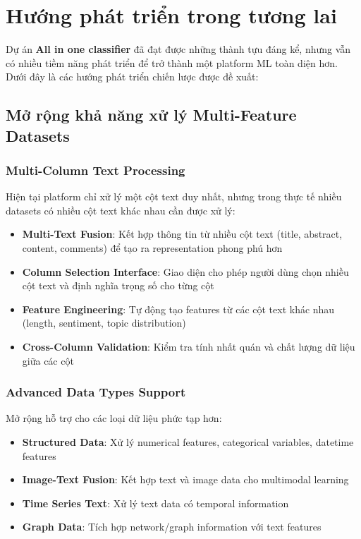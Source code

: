 \section{Hướng phát triển trong tương lai}

\noindent
Dự án \textbf{All in one classifier} đã đạt được những thành tựu đáng kể, nhưng vẫn có nhiều tiềm năng phát triển để trở thành một platform ML toàn diện hơn. Dưới đây là các hướng phát triển chiến lược được đề xuất:

\subsection{Mở rộng khả năng xử lý Multi-Feature Datasets}

\subsubsection{Multi-Column Text Processing}

Hiện tại platform chỉ xử lý một cột text duy nhất, nhưng trong thực tế nhiều datasets có nhiều cột text khác nhau cần được xử lý:

\begin{itemize}
    \item \textbf{Multi-Text Fusion}: Kết hợp thông tin từ nhiều cột text (title, abstract, content, comments) để tạo ra representation phong phú hơn
    \item \textbf{Column Selection Interface}: Giao diện cho phép người dùng chọn nhiều cột text và định nghĩa trọng số cho từng cột
    \item \textbf{Feature Engineering}: Tự động tạo features từ các cột text khác nhau (length, sentiment, topic distribution)
    \item \textbf{Cross-Column Validation}: Kiểm tra tính nhất quán và chất lượng dữ liệu giữa các cột
\end{itemize}

\subsubsection{Advanced Data Types Support}

Mở rộng hỗ trợ cho các loại dữ liệu phức tạp hơn:

\begin{itemize}
    \item \textbf{Structured Data}: Xử lý numerical features, categorical variables, datetime features
    \item \textbf{Image-Text Fusion}: Kết hợp text và image data cho multimodal learning
    \item \textbf{Time Series Text}: Xử lý text data có temporal information
    \item \textbf{Graph Data}: Tích hợp network/graph information với text features
\end{itemize}

